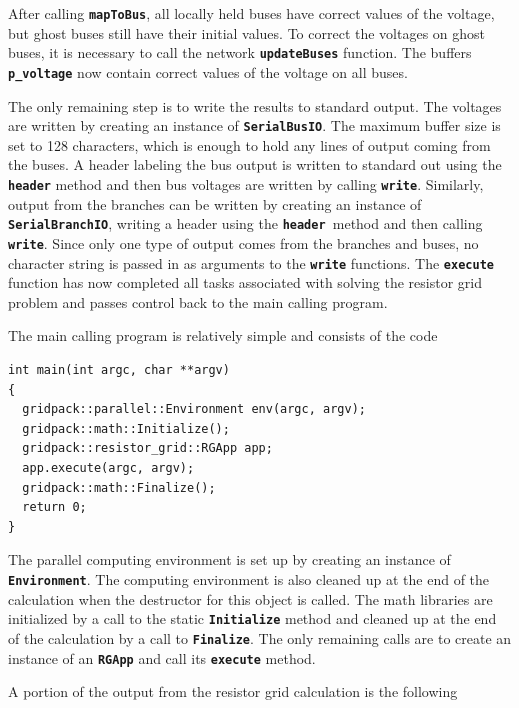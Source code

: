 \documentclass[12pt]{report} %
\begin{document}
After calling \texttt{\textbf{mapToBus}}, all locally held buses have correct values of the voltage, but ghost buses still have their initial values. To correct the voltages on ghost buses, it is necessary to call the network \texttt{\textbf{updateBuses}} function. The buffers \texttt{\textbf{p\_voltage}} now contain correct values of the voltage on all buses.

The only remaining step is to write the results to standard output. The voltages are written by creating an instance of \texttt{\textbf{SerialBusIO}}. The maximum buffer size is set to 128 characters, which is enough to hold any lines of output coming from the buses. A header labeling the bus output is written to standard out using the \texttt{\textbf{header}} method and then bus voltages are written by calling \texttt{\textbf{write}}. Similarly, output from the branches can be written by creating an instance of \texttt{\textbf{SerialBranchIO}}, writing a header using the \texttt{\textbf{header }}method and then calling \texttt{\textbf{write}}. Since only one type of output comes from the branches and buses, no character string is passed in as arguments to the \texttt{\textbf{write}} functions. The \texttt{\textbf{execute}} function has now completed all tasks associated with solving the resistor grid problem and passes control back to the main calling program.

The main calling program is relatively simple and consists of the code

{
\color{red}
\begin{Verbatim}[fontseries=b]
int main(int argc, char **argv)
{
  gridpack::parallel::Environment env(argc, argv);
  gridpack::math::Initialize();
  gridpack::resistor_grid::RGApp app;
  app.execute(argc, argv);
  gridpack::math::Finalize();
  return 0;
}
\end{Verbatim}
}

The parallel computing environment is set up by creating an instance of \texttt{\textbf{Environment}}. The computing environment is also cleaned up at the end of the calculation when the destructor for this object is called. The math libraries are initialized by a call to the static \texttt{\textbf{Initialize}} method and cleaned up at the end of the calculation by a call to \texttt{\textbf{Finalize}}. The only remaining calls are to create an instance of an \texttt{\textbf{RGApp}} and call its \texttt{\textbf{execute}} method.

A portion of the output from the resistor grid calculation is the following
\end{document}
